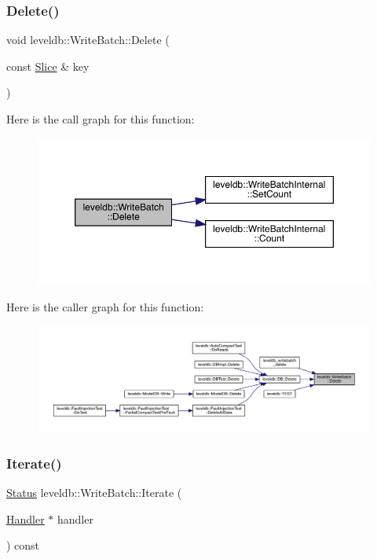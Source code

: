 \subsubsection{\texorpdfstring{Delete()}{Delete()}}
{\footnotesize\ttfamily void leveldb\+::\+Write\+Batch\+::\+Delete (\begin{DoxyParamCaption}\item[{const \mbox{\hyperlink{classleveldb_1_1_slice}{Slice}} \&}]{key }\end{DoxyParamCaption})}

Here is the call graph for this function\+:
\nopagebreak
\begin{figure}[H]
\begin{center}
\leavevmode
\includegraphics[width=350pt]{classleveldb_1_1_write_batch_a473da7f94483dab253cc36b7b231ce53_cgraph}
\end{center}
\end{figure}
Here is the caller graph for this function\+:
\nopagebreak
\begin{figure}[H]
\begin{center}
\leavevmode
\includegraphics[width=350pt]{classleveldb_1_1_write_batch_a473da7f94483dab253cc36b7b231ce53_icgraph}
\end{center}
\end{figure}
\mbox{\label{classleveldb_1_1_write_batch_a64278020155c37619bfe007840bb2d23}} 
\subsubsection{\texorpdfstring{Iterate()}{Iterate()}}
{\footnotesize\ttfamily \mbox{\hyperlink{classleveldb_1_1_status}{Status}} leveldb\+::\+Write\+Batch\+::\+Iterate (\begin{DoxyParamCaption}\item[{\mbox{\hyperlink{classleveldb_1_1_write_batch_1_1_handler}{Handler}} $\ast$}]{handler }\end{DoxyParamCaption}) const}

